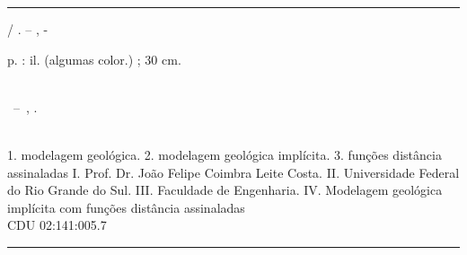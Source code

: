 \documentclass[
	12pt,				%
	openright,			%
	twoside,			%
	a4paper,			%
	english,			%
	french,				%
	spanish,			%
	brazil				%
	]{abntex2}
\begin{document}
\frenchspacing 


\imprimircapa

\imprimirfolhaderosto*


%
%     
\begin{fichacatalografica}
	\vspace*{\fill}					%
	\hrule							%
	\begin{center}					%
	\begin{minipage}[c]{12.5cm}		%
	
	\imprimirautor
	
	\hspace{0.5cm} \imprimirtitulo  / \imprimirautor. --
	\imprimirlocal, \imprimirdata-
	
	\hspace{0.5cm} \pageref{LastPage} p. : il. (algumas color.) ; 30 cm.\\
	
	\hspace{0.5cm} \imprimirorientadorRotulo~\imprimirorientador\\
	
	\hspace{0.5cm}
	\parbox[t]{\textwidth}{\imprimirtipotrabalho~--~\imprimirinstituicao,
	\imprimirdata.}\\
	
	\hspace{0.5cm}
		1. modelagem geológica.
		2. modelagem geológica implícita.
        3. funções distância assinaladas
		I. Prof. Dr. João Felipe Coimbra Leite Costa.
		II. Universidade Federal do Rio Grande do Sul.
		III. Faculdade de Engenharia.
		IV. Modelagem geológica implícita com funções distância assinaladas\\ 			
	
	\hspace{8.75cm} CDU 02:141:005.7\\
	
	\end{minipage}
	\end{center}
	\hrule
\end{fichacatalografica}
\end{document}
